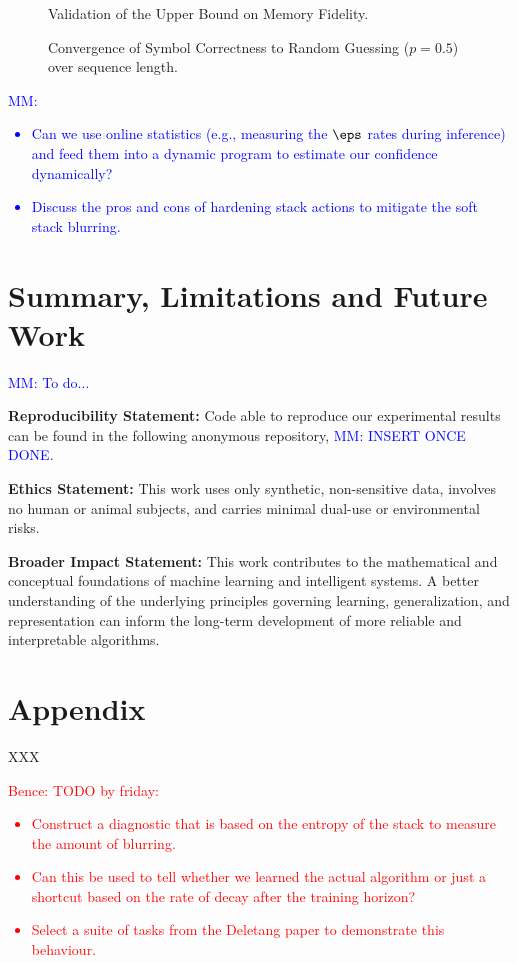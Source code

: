 \documentclass[10pt]{article} %
\newcommand{\mm}[1]{\textcolor{blue}{MM: #1}}
\newcommand{\bence}[1]{\textcolor{red}{Bence: #1}}
\begin{document}
\begin{figure}[ht]
    \centering
    \caption{Validation of the Upper Bound on Memory Fidelity.}
    \label{fig:memfid}
\end{figure}

\begin{figure}[ht]
    \centering
    \caption{Convergence of Symbol Correctness to Random Guessing ($p=0.5$) over sequence length.}
    \label{fig:randomguess}
\end{figure}

\mm{
\begin{itemize}
    \item Can we use online statistics (e.g., measuring the $\eps$ rates during inference) and feed them into a dynamic program to estimate our confidence dynamically?
    \item Discuss the pros and cons of hardening stack actions to mitigate the soft stack blurring.
\end{itemize}
}

\section{Summary, Limitations and Future Work}

\mm{To do...}

\textbf{Reproducibility Statement:} Code able to reproduce our experimental results can be found in the following anonymous repository, \mm{INSERT ONCE DONE}.

\textbf{Ethics Statement:} This work uses only synthetic, non-sensitive data, involves no human or animal subjects, and carries minimal dual-use or environmental risks.

\textbf{Broader Impact Statement:} This work contributes to the mathematical and conceptual foundations of machine learning and intelligent systems. A better understanding of the underlying principles governing learning, generalization, and representation can inform the long-term development of more reliable and interpretable algorithms.




\appendix
\section{Appendix}
XXX

\bence{TODO by friday:
\begin{itemize}
    \item Construct a diagnostic that is based on the entropy of the stack to measure the amount of blurring.
    \item Can this be used to tell whether we learned the actual algorithm or just a shortcut based on the rate of decay after the training horizon?
    \item Select a suite of tasks from the Deletang paper to demonstrate this behaviour.
\end{itemize}}
\end{document}
